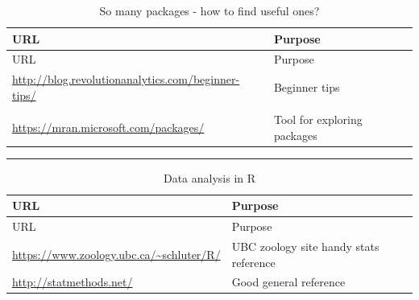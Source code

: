 \documentclass[
]{book}
\begin{document}
\begin{longtable}[]{@{}
  >{\raggedright\arraybackslash}p{}
  >{\raggedright\arraybackslash}p{}@{}}
\caption{So many packages - how to find useful ones?}\tabularnewline
\toprule\noalign{}
\begin{minipage}[b]{\linewidth}\raggedright
URL
\end{minipage} & \begin{minipage}[b]{\linewidth}\raggedright
Purpose
\end{minipage} \\
\midrule\noalign{}
\endfirsthead
\toprule\noalign{}
\begin{minipage}[b]{\linewidth}\raggedright
URL
\end{minipage} & \begin{minipage}[b]{\linewidth}\raggedright
Purpose
\end{minipage} \\
\midrule\noalign{}
\endhead
\bottomrule\noalign{}
\endlastfoot
\url{http://blog.revolutionanalytics.com/beginner-tips/} & Beginner tips \\
& \\
\url{https://mran.microsoft.com/packages/} & Tool for exploring packages \\
\end{longtable}

\begin{center}\rule{0.5\linewidth}{0.5pt}\end{center}

\begin{longtable}[]{@{}
  >{\raggedright\arraybackslash}p{}
  >{\raggedright\arraybackslash}p{}@{}}
\caption{Data analysis in R}\tabularnewline
\toprule\noalign{}
\begin{minipage}[b]{\linewidth}\raggedright
URL
\end{minipage} & \begin{minipage}[b]{\linewidth}\raggedright
Purpose
\end{minipage} \\
\midrule\noalign{}
\endfirsthead
\toprule\noalign{}
\begin{minipage}[b]{\linewidth}\raggedright
URL
\end{minipage} & \begin{minipage}[b]{\linewidth}\raggedright
Purpose
\end{minipage} \\
\midrule\noalign{}
\endhead
\bottomrule\noalign{}
\endlastfoot
\url{https://www.zoology.ubc.ca/~schluter/R/} & UBC zoology site handy stats reference \\
\url{http://statmethods.net/} & Good general reference \\
\end{longtable}
\end{document}
